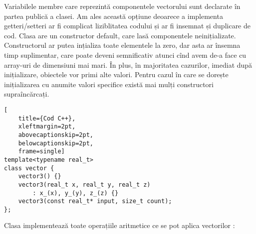 Variabilele membre care reprezintă componentele vectorului sunt declarate în
partea publică a clasei. Am ales această opțiune deoarece a implementa
getteri/setteri ar fi complicat liziblitatea codului și ar fi insemnat 
și duplicare de cod. Clasa are un constructor default, care lasă componentele
neinițializate. Constructorul ar putea ințializa toate elementele la zero, dar
asta ar însemna timp suplimentar, care poate deveni semnificativ atunci cînd 
avem de-a face cu array-uri de dimensiuni mai mari. În plus, în majoritatea
cazurilor, imediat după inițializare, obiectele vor primi alte valori. Pentru
cazul în care se dorește inițializarea cu anumite valori specifice există mai 
mulți constructori supraîncărcați.
\begin{lstlisting}[
    title={Cod C++}, 
    xleftmargin=2pt,
    abovecaptionskip=2pt,
    belowcaptionskip=2pt,
    frame=single]
template<typename real_t>
class vector {
    vector3() {}
    vector3(real_t x, real_t y, real_t z) 
        : x_(x), y_(y), z_(z) {}
    vector3(const real_t* input, size_t count);
};
\end{lstlisting}
Clasa implementează toate operațiile aritmetice ce se pot aplica vectorilor :
